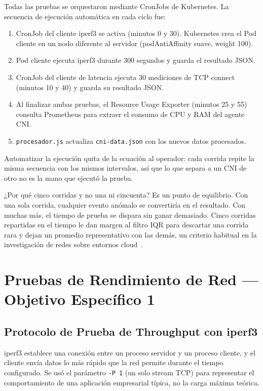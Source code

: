 Todas las pruebas se orquestaron mediante CronJobs de Kubernetes. La secuencia de ejecución automática en cada ciclo fue:
\begin{enumerate}
\item CronJob del cliente iperf3 se activa (minutos 0 y 30). Kubernetes crea el Pod cliente en un nodo diferente al servidor (podAntiAffinity suave, weight 100).
\item Pod cliente ejecuta iperf3 durante 300 segundos y guarda el resultado JSON.
\item CronJob del cliente de latencia ejecuta 30 mediciones de TCP connect (minutos 10 y 40) y guarda su resultado JSON.
\item Al finalizar ambas pruebas, el Resource Usage Exporter (minutos 25 y 55) consulta Prometheus para extraer el consumo de CPU y RAM del agente CNI.
\item \texttt{procesador.js} actualiza \texttt{cni-data.json} con los nuevos datos procesados.
\end{enumerate}

Automatizar la ejecución quita de la ecuación al operador: cada corrida repite la misma secuencia con los mismos intervalos, así que lo que separa a un CNI de otro no es la mano que ejecutó la prueba.

¿Por qué cinco corridas y no una ni cincuenta? Es un punto de equilibrio. Con una sola corrida, cualquier evento anómalo se convertiría en el resultado. Con muchas más, el tiempo de prueba se dispara sin ganar demasiado. Cinco corridas repartidas en el tiempo le dan margen al filtro IQR para descartar una corrida rara y dejan un promedio representativo con las demás, un criterio habitual en la investigación de redes sobre entornos cloud~\cite{ref7,ref8}.

\section{Pruebas de Rendimiento de Red --- Objetivo Específico 1}

\subsection{Protocolo de Prueba de Throughput con iperf3}

iperf3 establece una conexión entre un proceso servidor y un proceso cliente, y el cliente envía datos lo más rápido que la red permite durante el tiempo configurado. Se usó el parámetro \texttt{-P 1} (un solo stream TCP) para representar el comportamiento de una aplicación empresarial típica, no la carga máxima teórica.

